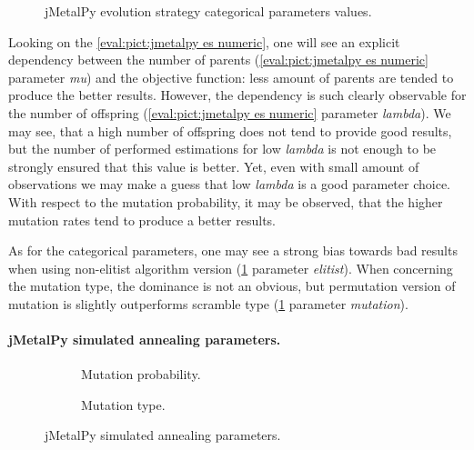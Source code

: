 \begin{figure}[h!]
	\centering
	\vspace{-20pt}
	
	\caption{jMetalPy evolution strategy categorical parameters values.}
	\label{eval:pict:jmetalpy es categoric}
	\vspace{-20pt}
\end{figure}

Looking on the \cref{eval:pict:jmetalpy es numeric}, one will see an explicit dependency between the number of parents (\cref{eval:pict:jmetalpy es numeric} parameter \emph{mu}) and the objective function: less amount of parents are tended to produce the better results. However, the dependency is such clearly observable for the number of offspring (\cref{eval:pict:jmetalpy es numeric} parameter \emph{lambda}). We may see, that a high number of offspring does not tend to provide good results, but the number of performed estimations for low \emph{lambda} is not enough to be strongly ensured that this value is better. Yet, even with small amount of observations we may make a guess that low \emph{lambda} is a good parameter choice. With respect to the mutation probability, it may be observed, that the higher mutation rates tend to produce a better results. 

As for the categorical parameters, one may see a strong bias towards bad results when using non-elitist algorithm version (\cref{eval:pict:jmetalpy es categoric} parameter \emph{elitist}). When concerning the mutation type, the dominance is not an obvious, but permutation version of mutation is slightly outperforms scramble type (\cref{eval:pict:jmetalpy es categoric} parameter \emph{mutation}).


\paragraph{jMetalPy simulated annealing parameters.}
\begin{figure}[h]
	\centering
	\begin{subfigure}{0.35\textwidth}
		\vspace{-10pt}
		
		\caption{Mutation probability.}
		\label{eval:pict:jmetalpy sa numeric}
	\end{subfigure}
	\hfil 
	\begin{subfigure}{0.4\textwidth}
		
		\vspace{-5pt}
		\caption{Mutation type.}
		\label{eval:pict:jmetalpy sa categoric}
	\end{subfigure}
	\caption{jMetalPy simulated annealing parameters.}
\end{figure}


